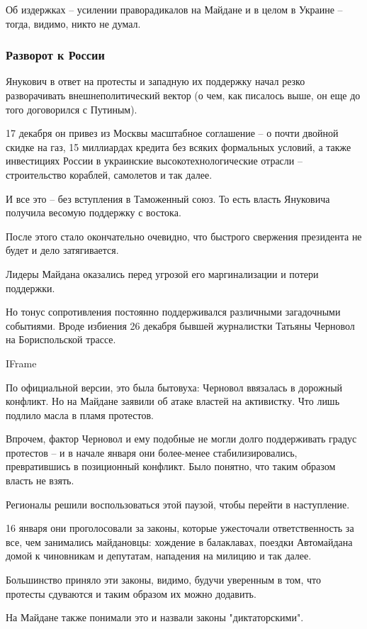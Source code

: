 Об издержках – усилении праворадикалов на Майдане и в целом в Украине –
тогда, видимо, никто не думал.  

\subsubsection{Разворот к России }

Янукович в ответ на протесты и западную их поддержку начал резко
разворачивать внешнеполитический вектор (о чем, как писалось выше, он еще
до того договорился с Путиным).

17 декабря он привез из Москвы масштабное соглашение – о почти двойной
скидке на газ, 15 миллиардах кредита без всяких формальных условий, а
также инвестициях России в украинские высокотехнологические отрасли –
строительство кораблей, самолетов и так далее. 

И все это – без вступления в Таможенный союз. То есть власть Януковича
получила весомую поддержку с востока.

После этого стало окончательно очевидно, что быстрого свержения президента
не будет и дело затягивается.

Лидеры Майдана оказались перед угрозой его маргинализации и потери
поддержки.

Но тонус сопротивления постоянно поддерживался различными загадочными
событиями. Вроде избиения 26 декабря бывшей журналистки Татьяны Черновол
на Бориспольской трассе.

IFrame

По официальной версии, это была бытовуха: Черновол ввязалась в дорожный
конфликт. Но на Майдане заявили об атаке властей на активистку. Что лишь
подлило масла в пламя протестов. 

Впрочем, фактор Черновол и ему подобные не могли долго поддерживать градус
протестов – и в начале января они более-менее стабилизировались,
превратившись в позиционный конфликт. Было понятно, что таким образом
власть не взять.

Регионалы решили воспользоваться этой паузой, чтобы перейти в наступление.

16 января они проголосовали за законы, которые ужесточали ответственность
за все, чем занимались майдановцы: хождение в балаклавах, поездки
Автомайдана домой к чиновникам и депутатам, нападения на милицию и так
далее. 

Большинство приняло эти законы, видимо, будучи уверенным в том, что
протесты сдуваются и таким образом их можно додавить.

На Майдане также понимали это и назвали законы "диктаторскими". 

